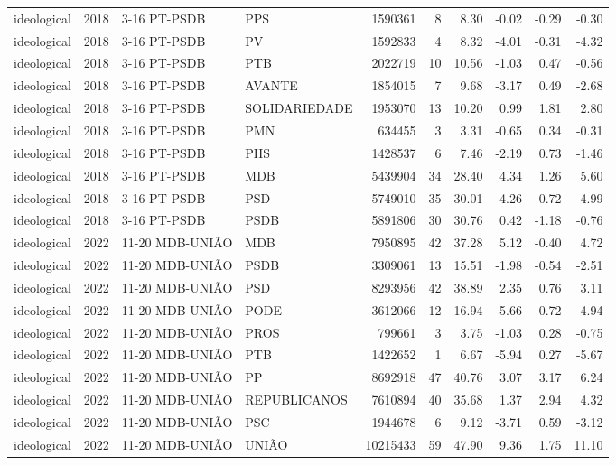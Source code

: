 \begin{landscape}
\begin{longtable}{lllL{2.8cm}rrrrrr}
ideological & 2018 & 3-16 PT-PSDB & PPS & 1590361 & 8 & 8.30 & -0.02 & -0.29 & -0.30 \\
ideological & 2018 & 3-16 PT-PSDB & PV & 1592833 & 4 & 8.32 & -4.01 & -0.31 & -4.32 \\
ideological & 2018 & 3-16 PT-PSDB & PTB & 2022719 & 10 & 10.56 & -1.03 & 0.47 & -0.56 \\
ideological & 2018 & 3-16 PT-PSDB & AVANTE & 1854015 & 7 & 9.68 & -3.17 & 0.49 & -2.68 \\
ideological & 2018 & 3-16 PT-PSDB & SOLIDARIEDADE & 1953070 & 13 & 10.20 & 0.99 & 1.81 & 2.80 \\
ideological & 2018 & 3-16 PT-PSDB & PMN & 634455 & 3 & 3.31 & -0.65 & 0.34 & -0.31 \\
ideological & 2018 & 3-16 PT-PSDB & PHS & 1428537 & 6 & 7.46 & -2.19 & 0.73 & -1.46 \\
ideological & 2018 & 3-16 PT-PSDB & MDB & 5439904 & 34 & 28.40 & 4.34 & 1.26 & 5.60 \\
ideological & 2018 & 3-16 PT-PSDB & PSD & 5749010 & 35 & 30.01 & 4.26 & 0.72 & 4.99 \\
ideological & 2018 & 3-16 PT-PSDB & PSDB & 5891806 & 30 & 30.76 & 0.42 & -1.18 & -0.76 \\
ideological & 2022 & 11-20 MDB-UNIÃO & MDB & 7950895 & 42 & 37.28 & 5.12 & -0.40 & 4.72 \\
ideological & 2022 & 11-20 MDB-UNIÃO & PSDB & 3309061 & 13 & 15.51 & -1.98 & -0.54 & -2.51 \\
ideological & 2022 & 11-20 MDB-UNIÃO & PSD & 8293956 & 42 & 38.89 & 2.35 & 0.76 & 3.11 \\
ideological & 2022 & 11-20 MDB-UNIÃO & PODE & 3612066 & 12 & 16.94 & -5.66 & 0.72 & -4.94 \\
ideological & 2022 & 11-20 MDB-UNIÃO & PROS & 799661 & 3 & 3.75 & -1.03 & 0.28 & -0.75 \\
ideological & 2022 & 11-20 MDB-UNIÃO & PTB & 1422652 & 1 & 6.67 & -5.94 & 0.27 & -5.67 \\
ideological & 2022 & 11-20 MDB-UNIÃO & PP & 8692918 & 47 & 40.76 & 3.07 & 3.17 & 6.24 \\
ideological & 2022 & 11-20 MDB-UNIÃO & REPUBLICANOS & 7610894 & 40 & 35.68 & 1.37 & 2.94 & 4.32 \\
ideological & 2022 & 11-20 MDB-UNIÃO & PSC & 1944678 & 6 & 9.12 & -3.71 & 0.59 & -3.12 \\
ideological & 2022 & 11-20 MDB-UNIÃO & UNIÃO & 10215433 & 59 & 47.90 & 9.36 & 1.75 & 11.10 \\

\end{longtable}
\end{landscape}
